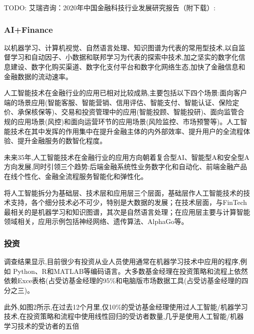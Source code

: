 \documentclass[letterpaper,10pt,english]{sphinxmanual}
\begin{document}
TODO:
艾瑞咨询：2020年中国金融科技行业发展研究报告（附下载）:


\subsubsection{AI+Finance}
\label{\detokenize{chapter_AI+Finance/AI_Finance:ai-finance}}\label{\detokenize{chapter_AI+Finance/AI_Finance::doc}}
以机器学习、计算机视觉、自然语言处理、知识图谱为代表的常用型技术,以自监督学习和自动因子、小数据和联邦学习为代表的探索中技术,加之坚实的数字化信息建设、数字化购买渠道、数字化支付平台和数字化网络生态,加快了金融信息和金融数据的流动速率。

人工智能技术在金融行业的应用已相对比较成熟,主要包括以下四个场景:面向客户端的场景应用(智能客服、智能营销、信用评估、智能支付、智能认证、保险定价、承保核保等)、交易和投资管理中的应用(智能投顾、智能投研)、面向监管合规的应用场景(风控)和面向运营环节的应用场景(风险监控、市场预警等)。人工智能技术在其中发挥的作用集中在提升金融主体的内外部效率、提升用户的全流程体验、提升金融服务的数智化程度。

未来3\sphinxhyphen{}5年,人工智能技术在金融行业的应用方向朝着复合型AI、智能型A和安全型A方向发展,同时引领三个趋势:后端金融系统性业务数字化和自动化、前端金融产品在线个性化、金融全流程服务智能化和弹性化。

将人工智能拆分为基础层、技术层和应用层三个层面，基础层作人工智能技术的技术支持，各个细分技术必不可少，特别是大数据的发展；在技术层面，与FinTech最相关的是机器学习和知识图谱，其次是自然语言处理；在应用层主要与计算智能领域相关，应用示例包括神经网络、遗传算法、AlphaGo等。


\subsubsection{投资}
\label{\detokenize{chapter_AI+Finance/Invest:id1}}\label{\detokenize{chapter_AI+Finance/Invest::doc}}
调查结果显示,目前很少有投资从业人员使用通常在机器学习技术中应用的程序,例如
Python、R和MATLAB等编码语言。大多数基金经理在投资策略和流程上依然依赖Exce表格(占受访基金经理的95\%和电脑版市场数据工具(占受访基金经理的四分之三)。

此外,如图2所示,在过去12个月里,仅10\%的受访基金经理使用过人工智能/机器学习技术,在投资策略和流程中使用线性回归的受访者数量,几乎是使用人工智能/机器学习技术的受访者的五倍
\end{document}
